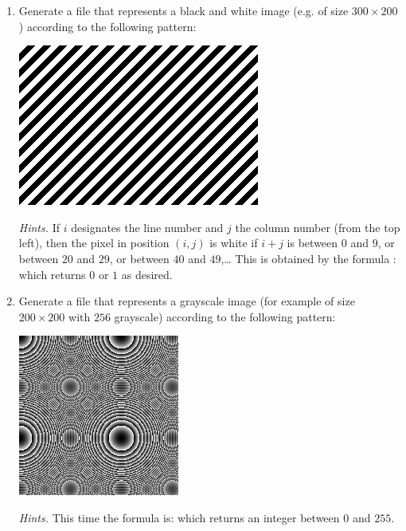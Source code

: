 \documentclass[11pt,class=report,crop=false]{standalone}
\begin{document}
\begin{activite}



\begin{enumerate}
  \item Generate a file  that represents a black and white image (e.g. of size $300 \times 200$) according to the following pattern:
\begin{center}
\includegraphics[scale=\myscale,scale=0.5]{screen-image_nb}
\end{center}   

\emph{Hints.} If $i$ designates the line number and $j$ the column number (from the top left), then the pixel in position $(i,j)$ is white if $i+j$ is between $0$ and $9$, or between $20$ and $29$, or between $40$ and $49$,\ldots{} This is obtained by the formula :
which returns $0$ or $1$ as desired.

  \item Generate a file  that represents a grayscale image (for example of size $200 \times 200$ with $256$ grayscale) according to the following pattern:
\begin{center}
\includegraphics[scale=\myscale,scale=0.7]{screen-image_gris}
\end{center}   

\emph{Hints.} This time the formula is:
which returns an integer between $0$ and $255$.


\end{enumerate}
\end{activite}
\end{document}
